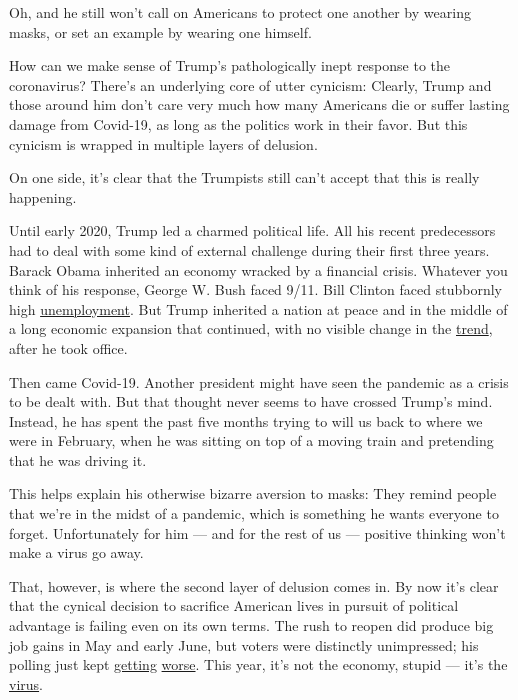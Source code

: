 Oh, and he still won't call on Americans to protect one another by
wearing masks, or set an example by wearing one himself.

How can we make sense of Trump's pathologically inept response to the
coronavirus? There's an underlying core of utter cynicism: Clearly,
Trump and those around him don't care very much how many Americans die
or suffer lasting damage from Covid-19, as long as the politics work in
their favor. But this cynicism is wrapped in multiple layers of
delusion.

On one side, it's clear that the Trumpists still can't accept that this
is really happening.

Until early 2020, Trump led a charmed political life. All his recent
predecessors had to deal with some kind of external challenge during
their first three years. Barack Obama inherited an economy wracked by a
financial crisis. Whatever you think of his response, George W. Bush
faced 9/11. Bill Clinton faced stubbornly high
\href{https://fred.stlouisfed.org/series/UNRATE}{unemployment}. But
Trump inherited a nation at peace and in the middle of a long economic
expansion that continued, with no visible change in the
\href{https://fred.stlouisfed.org/series/PAYEMS}{trend}, after he took
office.

Then came Covid-19. Another president might have seen the pandemic as a
crisis to be dealt with. But that thought never seems to have crossed
Trump's mind. Instead, he has spent the past five months trying to will
us back to where we were in February, when he was sitting on top of a
moving train and pretending that he was driving it.

This helps explain his otherwise bizarre aversion to masks: They remind
people that we're in the midst of a pandemic, which is something he
wants everyone to forget. Unfortunately for him --- and for the rest of
us --- positive thinking won't make a virus go away.

That, however, is where the second layer of delusion comes in. By now
it's clear that the cynical decision to sacrifice American lives in
pursuit of political advantage is failing even on its own terms. The
rush to reopen did produce big job gains in May and early June, but
voters were distinctly unimpressed; his polling just kept
\href{https://projects.fivethirtyeight.com/polls/president-general/national/}{getting}
\href{https://projects.fivethirtyeight.com/trump-approval-ratings/?cid=rrpromo}{worse}.
This year, it's not the economy, stupid --- it's the
\href{https://www.cnn.com/2020/07/09/politics/2020-election-issues-coronavirus-trump/index.html}{virus}.

